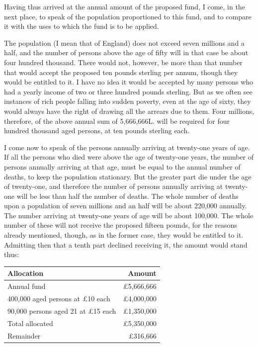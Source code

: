 Having thus arrived at the annual amount of the proposed fund, I come, in the next place, to speak of the population proportioned to this fund, and to compare it with the uses to which the fund is to be applied.\par

The population (I mean that of England) does not exceed seven millions and a half, and the number of persons above the age of fifty will in that case be about four hundred thousand. There would not, however, be more than that number that would accept the proposed ten pounds sterling per annum, though they would be entitled to it. I have no idea it would be accepted by many persons who had a yearly income of two or three hundred pounds sterling. But as we often see instances of rich people falling into sudden poverty, even at the age of sixty, they would always have the right of drawing all the arrears due to them. Four millions, therefore, of the above annual sum of 5,666,666L. will be required for four hundred thousand aged persons, at ten pounds sterling each.\par

I come now to speak of the persons annually arriving at twenty-one years of age. If all the persons who died were above the age of twenty-one years, the number of persons annually arriving at that age, must be equal to the annual number of deaths, to keep the population stationary. But the greater part die under the age of twenty-one, and therefore the number of persons annually arriving at twenty-one will be less than half the number of deaths. The whole number of deaths upon a population of seven millions and an half will be about 220,000 annually. The number arriving at twenty-one years of age will be about 100,000. The whole number of these will not receive the proposed fifteen pounds, for the reasons already mentioned, though, as in the former case, they would be entitled to it. Admitting then that a tenth part declined receiving it, the amount would stand thus:\par

\begingroup
\setlength{\parindent}{0pt}
\renewcommand{\arraystretch}{1.45}
\setlength{\tabcolsep}{7pt}
\noindent\begin{tabularx}{\textwidth}{@{}Xr@{}}
\arrayrulecolor{rule}
\rowcolor{headbg}
\textbf{Allocation} & \textbf{Amount} \\
\hline
Annual fund & £5,666,666 \\
400,000 aged persons at £10 each & £4,000,000 \\
90,000 persons aged 21 at £15 each & £1,350,000 \\
Total allocated & £5,350,000 \\
Remainder & £316,666 \\
\hline
\end{tabularx}
\endgroup
\vspace{10pt}

